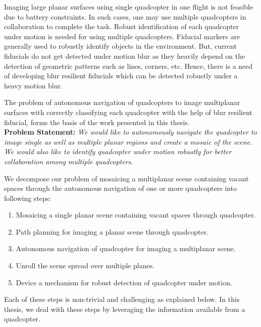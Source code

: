 Imaging large planar surfaces using single quadcopter in one flight is not
feasible due to battery constraints. In such cases, one may use multiple
quadcopters in collaboration to complete the task. Robust identification of
each quadcopter under motion is needed for using multiple quadcopters. Fiducial
markers are generally used to robustly identify objects in the environment. But,
current fiducials do not get detected under motion blur as they heavily depend on the
detection of geometric patterns such as lines, corners, etc. Hence, there is a
need of developing blur resilient fiducials which can be detected robustly under
a heavy motion blur.

The problem of autonomous navigation of quadcopters to image multiplanar
surfaces with correctly classifying each quadcopter with the help of blur
resilient fiducial, forms the basis of the work presented in this thesis.\\

\noindent\textbf{Problem Statement:}
\textit{We would like to autonomously navigate the quadcopter to image
single as well as multiple planar regions and create a mosaic of the 
scene. We would also like to identify quadcopter under motion robustly for
better collaboration among multiple quadcopters.} 

We decompose our problem of mosaicing a multiplanar scene containing
vacant spaces through the autonomous navigation of one or more quadcopters
into following steps:
\begin{enumerate}
  \item Mosaicing a single planar scene containing vacant spaces through
  quadcopter.
  \item Path planning for imaging a planar scene through quadcopter.
  \item Autonomous navigation of quadcopter for imaging a multiplanar scene.
  \item Unroll the scene spread over multiple planes.
  \item Device a mechanism for robust detection of quadcopter under motion. 
\end{enumerate}
Each of these steps is non-trivial and challenging as explained below. In this
thesis, we deal with these steps by leveraging the information available from a quadcopter.  

